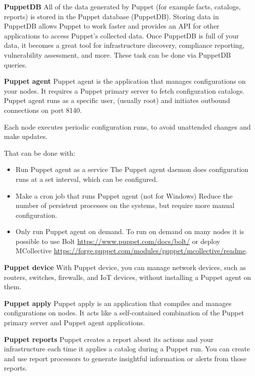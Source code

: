 \documentclass[12pt,a4paper,openright,twoside]{book}
\begin{document}
\textbf{PuppetDB}
All of the data generated by Puppet (for example facts, catalogs, reports) is stored in the Puppet database (PuppetDB).
Storing data in PuppetDB allows Puppet to work faster and provides an API for other applications to access Puppet's collected data.
Once PuppetDB is full of your data, it becomes a great tool for infrastructure discovery, compliance reporting, vulnerability assessment, and more. These task can be done via PuppetDB queries. \cite{puppetDocPuppetDB}

\textbf{Puppet agent}
Puppet agent is the application that manages configurations on your nodes. It requires a Puppet primary server to fetch configuration catalogs.
Puppet agent runs as a specific user, (usually root) and initiates outbound connections on port 8140.

Each node executes periodic configuration runs, to avoid unattended changes and make updates.

That can be done with:
\begin{itemize}
    \item Run Puppet agent as a service
    The Puppet agent daemon does configuration runs at a set interval, which can be configured.
    \item Make a cron job that runs Puppet agent (not for Windows)
    Reduce the number of persistent processes on the systems, but require more manual configuration.
    \item Only run Puppet agent on demand.
    To run on demand on many nodes it is possible to use Bolt \url{https://www.puppet.com/docs/bolt/} or deploy MCollective \url{https://forge.puppet.com/modules/puppet/mcollective/readme}.
\end{itemize}

\cite{puppetDocAgentNix} \cite{puppetDocAgentWin}

\textbf{Puppet device}
With Puppet device, you can manage network devices, such as routers, switches, firewalls, and IoT devices, without installing a Puppet agent on them. \cite{puppetDocDevice}

\textbf{Puppet apply}
Puppet apply is an application that compiles and manages configurations on nodes. It acts like a self-contained combination of the Puppet primary server and Puppet agent applications. \cite{puppetDocApply}

\textbf{Puppet reports}
Puppet creates a report about its actions and your infrastructure each time it applies a catalog during a Puppet run. You can create and use report processors to generate insightful information or alerts from those reports. \cite{puppetDocReports}
\end{document}
